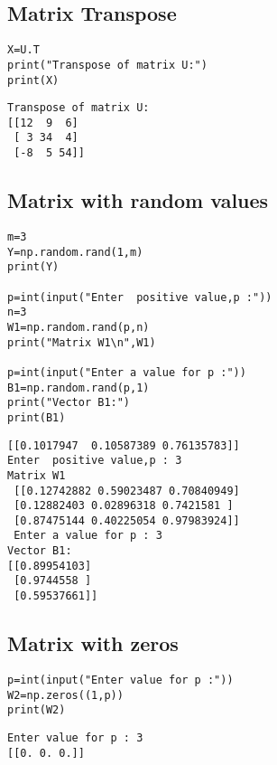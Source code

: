 \subsection{Matrix Transpose}
\vspace{-.75cm}
\begin{code}
\begin{lstlisting}
X=U.T
print("Transpose of matrix U:")
print(X) 
\end{lstlisting}
\end{code}
\vspace{-1cm}
\begin{verbatim}
Transpose of matrix U:
[[12  9  6]
 [ 3 34  4]
 [-8  5 54]]
\end{verbatim}
\vspace{-.75cm}
\newpage
\subsection{Matrix with random values}
\vspace{-.75cm}
\begin{code}
\begin{lstlisting}
m=3
Y=np.random.rand(1,m)
print(Y) 

p=int(input("Enter  positive value,p :"))
n=3
W1=np.random.rand(p,n)
print("Matrix W1\n",W1)

p=int(input("Enter a value for p :"))
B1=np.random.rand(p,1)
print("Vector B1:")
print(B1)
\end{lstlisting}
\end{code}
\vspace{-1cm}
\begin{verbatim}
[[0.1017947  0.10587389 0.76135783]]
Enter  positive value,p : 3
Matrix W1
 [[0.12742882 0.59023487 0.70840949]
 [0.12882403 0.02896318 0.7421581 ]
 [0.87475144 0.40225054 0.97983924]]
 Enter a value for p : 3
Vector B1:
[[0.89954103]
 [0.9744558 ]
 [0.59537661]]
\end{verbatim}
\vspace{-.75cm}
\subsection{Matrix with zeros}
\vspace{-.6cm}
\begin{code}
\begin{lstlisting}
p=int(input("Enter value for p :"))
W2=np.zeros((1,p))
print(W2)

\end{lstlisting}
\end{code}
\vspace{-.75cm}
\begin{verbatim}
Enter value for p : 3
[[0. 0. 0.]]

\end{verbatim}
\vspace{-.6cm}
